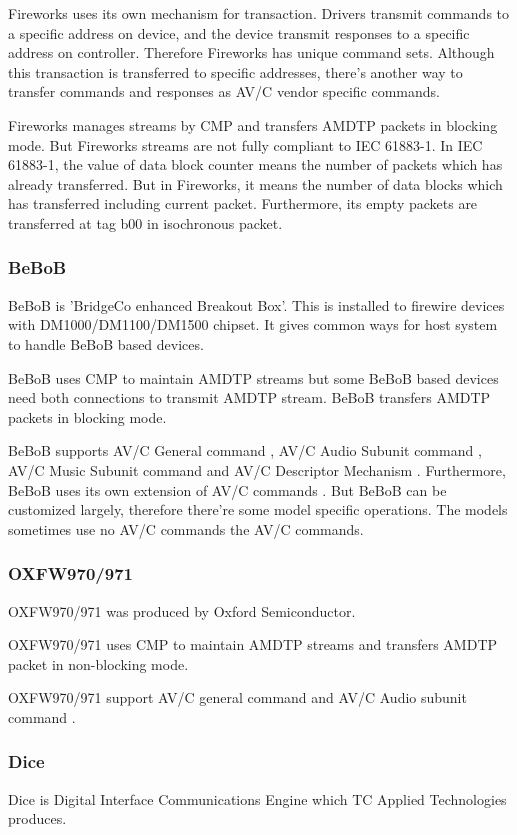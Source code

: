 \documentclass[onecolumn]{article}
\begin{document}
Fireworks uses its own mechanism for transaction. Drivers transmit commands to a specific address on device, and the device transmit responses to a specific address on controller. Therefore Fireworks has unique command sets. Although this transaction is transferred to specific addresses, there's another way to transfer commands and responses as AV/C vendor specific commands.

Fireworks manages streams by CMP and transfers AMDTP packets in blocking mode. But Fireworks streams are not fully compliant to IEC 61883-1. In IEC 61883-1, the value of data block counter means the number of packets which has already transferred. But in Fireworks, it means the number of data blocks which has transferred including current packet. Furthermore, its empty packets are transferred at tag b00 in isochronous packet.


\subsubsection{BeBoB}
BeBoB is 'BridgeCo enhanced Breakout Box'. This is installed to firewire devices with DM1000/DM1100/DM1500 chipset. It gives common ways for host system to handle BeBoB based devices.

BeBoB uses CMP to maintain AMDTP streams but some BeBoB based devices need both connections to transmit AMDTP stream. BeBoB transfers AMDTP packets in blocking mode.

BeBoB supports AV/C General command \cite{avc-general-4-2}, AV/C Audio Subunit command \cite{avc-audio-1}, AV/C Music Subunit command \cite{avc-music-1} and AV/C Descriptor Mechanism \cite{avc-general-enhancement}. Furthermore, BeBoB uses its own extension of AV/C commands \cite{bebob-1, bebob-2}. But BeBoB can be customized largely, therefore there're some model specific operations. The models sometimes use no AV/C commands the AV/C commands.


\subsubsection{OXFW970/971}
OXFW970/971 was produced by Oxford Semiconductor.

OXFW970/971 uses CMP to maintain AMDTP streams and transfers AMDTP packet in non-blocking mode.

OXFW970/971 support AV/C general command \cite{avc-general-4-2} and AV/C Audio subunit command \cite{avc-audio-1}.

\subsubsection{Dice}
Dice is Digital Interface Communications Engine which TC Applied Technologies produces.
\end{document}
